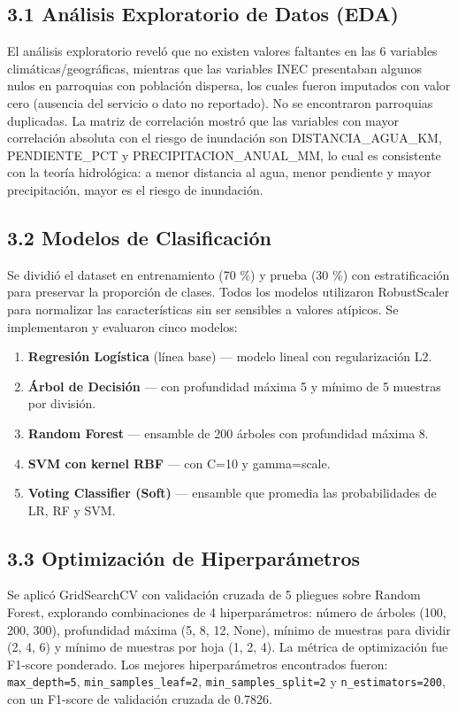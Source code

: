 \documentclass[12pt,a4paper]{article}
\begin{document}
\subsection{3.1 Análisis Exploratorio de Datos (EDA)}

El análisis exploratorio reveló que no existen valores faltantes en las 6 variables climáticas/geográficas, mientras que las variables INEC presentaban algunos nulos en parroquias con población dispersa, los cuales fueron imputados con valor cero (ausencia del servicio o dato no reportado). No se encontraron parroquias duplicadas. La matriz de correlación mostró que las variables con mayor correlación absoluta con el riesgo de inundación son DISTANCIA\_AGUA\_KM, PENDIENTE\_PCT y PRECIPITACION\_ANUAL\_MM, lo cual es consistente con la teoría hidrológica: a menor distancia al agua, menor pendiente y mayor precipitación, mayor es el riesgo de inundación.

\subsection{3.2 Modelos de Clasificación}

Se dividió el dataset en entrenamiento (70 \%) y prueba (30 \%) con estratificación para preservar la proporción de clases. Todos los modelos utilizaron RobustScaler para normalizar las características sin ser sensibles a valores atípicos. Se implementaron y evaluaron cinco modelos:

\begin{enumerate}
\item \textbf{Regresión Logística} (línea base) --- modelo lineal con regularización L2.
\item \textbf{Árbol de Decisión} --- con profundidad máxima 5 y mínimo de 5 muestras por división.
\item \textbf{Random Forest} --- ensamble de 200 árboles con profundidad máxima 8.
\item \textbf{SVM con kernel RBF} --- con C=10 y gamma=scale.
\item \textbf{Voting Classifier (Soft)} --- ensamble que promedia las probabilidades de LR, RF y SVM.
\end{enumerate}

\subsection{3.3 Optimización de Hiperparámetros}

Se aplicó GridSearchCV con validación cruzada de 5 pliegues sobre Random Forest, explorando combinaciones de 4 hiperparámetros: número de árboles (100, 200, 300), profundidad máxima (5, 8, 12, None), mínimo de muestras para dividir (2, 4, 6) y mínimo de muestras por hoja (1, 2, 4). La métrica de optimización fue F1-score ponderado. Los mejores hiperparámetros encontrados fueron: \texttt{max\_depth=5}, \texttt{min\_samples\_leaf=2}, \texttt{min\_samples\_split=2} y \texttt{n\_estimators=200}, con un F1-score de validación cruzada de 0.7826.
\end{document}
